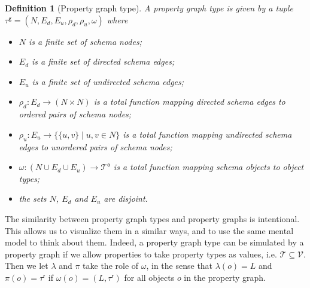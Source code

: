 \documentclass[a4paper]{article}
\newtheorem{definition}[theorem]{Definition}
\newcommand{\ptypes}{\mathcal{T}}
\newcommand{\rtype}{\tau^\mathsf{r}}
\newcommand{\otypes}{\mathcal{T}^\mathsf{o}}
\newcommand{\gtype}{\tau^\mathsf{g}}
\begin{document}
\begin{definition}[Property graph type]
  A \emph{property graph type} is given by a tuple $\gtype = (N, E_d, E_u, \rho_d, \rho_u, \omega)$ where 
  \begin{itemize}
    \item $N$ is a finite set of schema nodes;
    \item $E_d$ is a finite set of directed schema edges;
    \item $E_u$ is a finite set of undirected schema edges;
    \item $\rho_d : E_d \to (N \times N)$ is a total function mapping directed schema edges to ordered pairs of schema nodes;
    \item $\rho_u : E_u \to \{\{u, v\} \mid u, v \in N\}$ is a total function mapping undirected schema edges to unordered pairs of schema nodes;
    \item $\omega : (N \cup E_d \cup E_u) \to \otypes$ is a total function mapping schema objects to object types;
    \item the sets $N$, $E_d$ and $E_u$ are disjoint.
  \end{itemize}
\end{definition}

The similarity between property graph types and property graphs is intentional. This allows us to visualize them in a similar ways, and to use the same mental model to think about them. Indeed, a property graph type can be simulated by a property graph if we allow properties to take property types as values, i.e. $\ptypes \subseteq \mathcal{V}$. Then we let $\lambda$ and $\pi$ take the role of $\omega$, in the sense that $\lambda(o) = L$ and $\pi(o) = \rtype$ if $\omega(o) = (L, \rtype)$ for all objects $o$ in the property graph.
\end{document}
